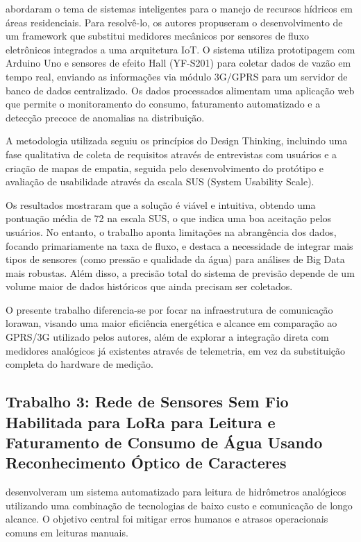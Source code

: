  abordaram o tema de sistemas inteligentes para o manejo de recursos hídricos em áreas residenciais. 
Para resolvê-lo, os autores propuseram o desenvolvimento de um framework que substitui medidores mecânicos por sensores de fluxo eletrônicos integrados a uma arquitetura IoT. 
O sistema utiliza prototipagem com Arduino Uno e sensores de efeito Hall (YF-S201) para coletar dados de vazão em tempo real, enviando as informações via módulo 3G/GPRS para um servidor de banco de dados centralizado. 
Os dados processados alimentam uma aplicação web que permite o monitoramento do consumo, faturamento automatizado e a detecção precoce de anomalias na distribuição.

A metodologia utilizada seguiu os princípios do Design Thinking, incluindo uma fase qualitativa de coleta de requisitos através de entrevistas com usuários e a criação de mapas de empatia, seguida pelo desenvolvimento do protótipo e avaliação de usabilidade através da escala SUS (System Usability Scale). 

Os resultados mostraram que a solução é viável e intuitiva, obtendo uma pontuação média de 72 na escala SUS, o que indica uma boa aceitação pelos usuários. 
No entanto, o trabalho aponta limitações na abrangência dos dados, focando primariamente na taxa de fluxo, e destaca a necessidade de integrar mais tipos de sensores (como pressão e qualidade da água) para análises de Big Data mais robustas. 
Além disso, a precisão total do sistema de previsão depende de um volume maior de dados históricos que ainda precisam ser coletados. 

O presente trabalho diferencia-se por focar na infraestrutura de comunicação \gls{lorawan}, visando uma maior eficiência energética e alcance em comparação ao GPRS/3G utilizado pelos autores, além de explorar a integração direta com medidores analógicos já existentes através de telemetria, em vez da substituição completa do hardware de medição. 

\subsection{Trabalho 3: Rede de Sensores Sem Fio Habilitada para LoRa para Leitura e Faturamento de Consumo de Água Usando Reconhecimento Óptico de Caracteres}

 desenvolveram um sistema automatizado para leitura de hidrômetros 
analógicos utilizando uma combinação de tecnologias de baixo custo e comunicação de longo alcance.
O objetivo central foi mitigar erros humanos e atrasos operacionais comuns em leituras manuais.

